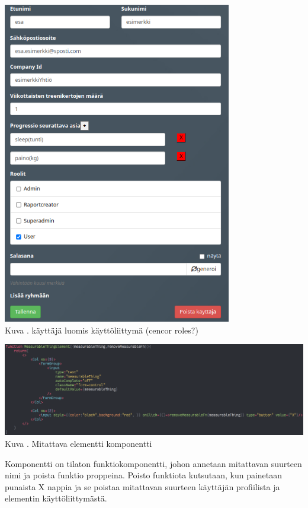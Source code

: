 \bigskip
\includegraphics[width = 10cm]{src/public/oppar/adminUserProfilePost.png}\\
Kuva \getImgCount {}. käyttäjä luomis käyttöliittymä (cencor roles?)
\bigskip


\includegraphics[width = 15cm]{src/public/oppar/measurableElementComponent.png}\\
Kuva \getImgCount {}. Mitattava elementti komponentti
\medskip

Komponentti on tilaton funktiokomponentti, johon annetaan mitattavan suurteen nimi ja poista funktio proppeina.
Poisto funktiota kutsutaan, kun painetaan punaista X nappia ja se poistaa mitattavan suurteen käyttäjän profiilista ja elementin käyttöliittymästä.
\medskip










